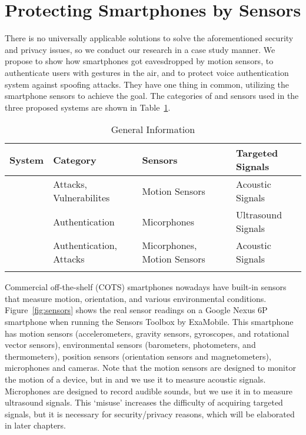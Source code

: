 \section{Protecting Smartphones by Sensors}
There is no universally applicable solutions to solve the aforementioned security and privacy issues, so we conduct our research in a case study manner. We propose {\spp} to show how smartphones got eavesdropped  by motion sensors, {\uu} to authenticate users with gestures in the air, and {\mv} to protect voice authentication system against spoofing attacks. They have one thing in common, utilizing the smartphone sensors to achieve the goal. The categories of and sensors used in the three proposed systems are shown in Table~\ref{tab:general}.

\begin{table}
	\caption{General Information}
	\label{tab:general}
	\centering
	\begin{tabular}{llll}
		\toprule
		System & Category & Sensors & Targeted Signals\\
		\midrule
		{\spp} 	& Attacks, Vulnerabilites & Motion Sensors& Acoustic Signals\\
		{\uu}& Authentication & Micorphones& Ultrasound Signals\\
		{\mv}& Authentication, Attacks & Micorphones, Motion Sensors & Acoustic Signals\\
		\bottomrule& 
	\end{tabular}
\end{table}

Commercial off-the-shelf (COTS) smartphones nowadays have built-in sensors that measure motion, orientation, and various environmental conditions. Figure~\ref{fig:sensors} shows the real sensor readings on a Google Nexus 6P smartphone when running the Sensors Toolbox by ExaMobile. This smartphone has motion sensors (accelerometers, gravity sensors, gyroscopes, and rotational vector sensors), environmental sensors (barometers, photometers, and thermometers), position sensors (orientation sensors and magnetometers), microphones and cameras. Note that the motion sensors are designed to monitor the motion of a device, but in {\spp} and {\mv} we use it to measure acoustic signals. Microphones are designed to record audible sounds, but we use it in {\uu} to measure ultrasound signals.
This `misuse' increases the difficulty of acquiring targeted signals, but it is necessary for security/privacy reasons, which will be elaborated in later chapters.

